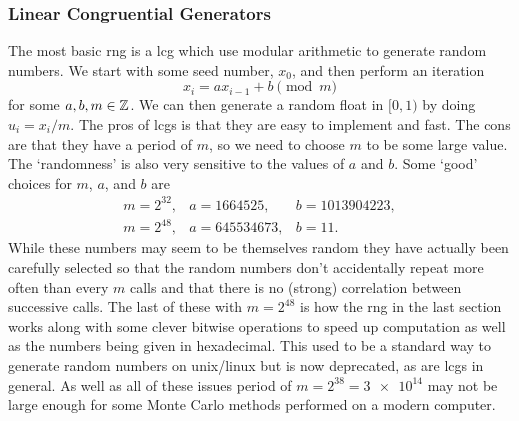 \documentclass[a4paper]{article}
\begin{document}
    \subsubsection{Linear Congruential Generators}
    The most basic \gls{rng} is a \gls{lcg} which use modular arithmetic to generate random numbers.
    We start with some seed number, \(x_0\), and then perform an iteration
    \[x_i = ax_{i-1} + b \pmod{m}\]
    for some \(a, b, m\in\mathbb{Z}\).
    We can then generate a random float in \([0, 1)\) by doing \(u_i = x_i/m\).
    The pros of \glspl{lcg} is that they are easy to implement and fast.
    The cons are that they have a period of \(m\), so we need to choose \(m\) to be some large value.
    The `randomness' is also very sensitive to the values of \(a\) and \(b\).
    Some `good' choices for \(m\), \(a\), and \(b\) are
    \[
        \begin{array}{lll}
            m = 2^{32}, & a = 1664525, & b = 1013904223,\\
            m = 2^{48}, & a = 645534673, & b = 11.
        \end{array}
    \]
    While these numbers may seem to be themselves random they have actually been carefully selected so that the random numbers don't accidentally repeat more often than every \(m\) calls and that there is no (strong) correlation between successive calls.
    The last of these with \(m = 2^{48}\) is how the \gls{rng} in the last section works along with some clever bitwise operations to speed up computation as well as the numbers being given in hexadecimal.
    This used to be a standard way to generate random numbers on unix/linux but is now deprecated, as are \glspl{lcg} in general.
    As well as all of these issues period of \(m = 2^{38} = \num{3e14}\) may not be large enough for some Monte Carlo methods performed on a modern computer.
    
\end{document}

